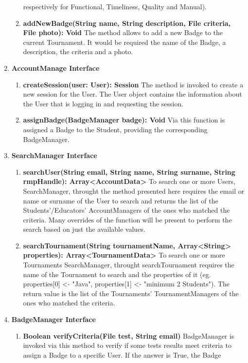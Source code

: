 \begin{enumerate}
\begin{enumerate}[label=$\bullet$]
            respectively for Functional, Timeliness, Quality and Manual).
            \item \textbf{addNewBadge(String name, String description, File criteria, File photo): Void} The method allows to add a new Badge to the current Tournament. It would be required the name of the Badge, a description, the criteria 
            and a photo.
        \end{enumerate}
    \item \textbf{AccountManage Interface} 
        \begin{enumerate}[label=$\bullet$]
            \item \textbf{createSession(user: User): Session} The method is invoked to create a new session for the User. The User object contains the information about the User that is logging in and requesting the session.
            \item \textbf{assignBadge(BadgeManager badge): Void} Via this function is assigned a Badge to the Student, providing the corresponding BadgeManager.
        \end{enumerate}
    \item \textbf{SearchManager Interface} 
        \begin{enumerate}[label=$\bullet$]
            \item \textbf{searchUser(String email, String name, String surname, String rmpHandle): Array<AccountData>} To search one or more Users, SearchManager, throught the method presented here requires the email or name or surname
            of the User to search and returns the list of the Students'/Educators' AccountManagers of the ones who matched the criteria. Many overrides of the function will be present to perform the search based on just the available values.
            \item \textbf{searchTournament(String tournamentName, Array<String> properties): Array<TournamentData> } To search one or more Tournaments SearchManager, throught searchTournament requires the name of the Tournament 
            to search and the properties of it (eg. properties[0] <- "Java", properties[1] <- "minimum 2 Students"). The return value is the list of the Tournaments' TournamentManagers of the ones who matched the criteria.
        \end{enumerate}
    \item \textbf{BadgeManager Interface}
        \begin{enumerate}[label=$\bullet$]
            \item \textbf{Boolean verifyCriteria(File test, String email)} BadgeManager is invoked via this method to verify if some tests results meet criteria to assign a Badge to a specific User. If the answer is True, the Badge

\end{enumerate}
\end{enumerate}
